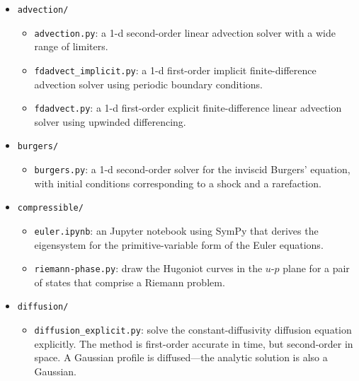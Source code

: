 \begin{itemize}

\item {\tt advection/}
  
  \begin{itemize}
  \item {\tt advection.py}: a 1-d second-order linear advection solver
    with a wide range of limiters.

  \item {\tt fdadvect\_implicit.py}: a 1-d first-order implicit
    finite-difference advection solver using periodic boundary
    conditions.

  \item {\tt fdadvect.py}: a 1-d first-order explicit
    finite-difference linear advection solver using upwinded
    differencing.

  \end{itemize}

\item {\tt burgers/}

  \begin{itemize}
  \item {\tt burgers.py}: a 1-d second-order solver for the inviscid
    Burgers' equation, with initial conditions corresponding to a
    shock and a rarefaction.

  \end{itemize}

\item {\tt compressible/}

  \begin{itemize}
  \item {\tt euler.ipynb}: an {\sf Jupyter} notebook using {\sf SymPy}
      that derives the eigensystem for the primitive-variable form
      of the Euler equations.
      
  \item {\tt riemann-phase.py}: draw the Hugoniot curves in the $u$-$p$ plane
     for a pair of states that comprise a Riemann problem.
  \end{itemize}

\item {\tt diffusion/}

  \begin{itemize}
    \item {\tt diffusion\_explicit.py}: solve the constant-diffusivity
      diffusion equation explicitly.  The method is first-order
      accurate in time, but second-order in space.  A Gaussian profile
      is diffused---the analytic solution is also a Gaussian.


\end{itemize}
\end{itemize}
